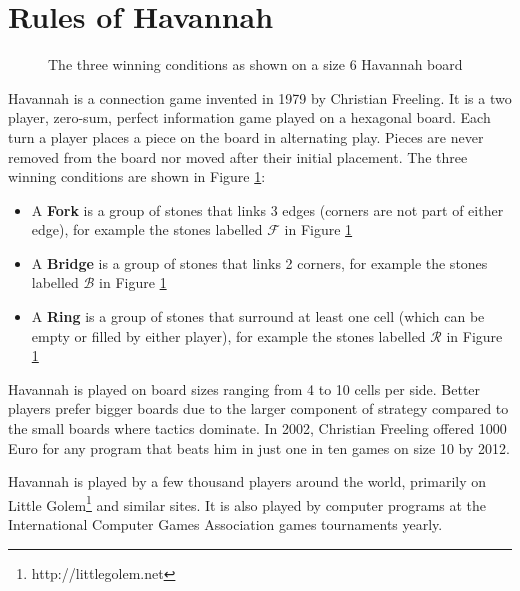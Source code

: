


\section{Rules of Havannah}


\begin{figure}[tb]
\centering
\begin{HavannahBoard}[board size=6,coordinate style=classical]
\end{HavannahBoard}
\caption{The three winning conditions as shown on a size 6 Havannah board}
\label{fig:rules}
\end{figure}

Havannah is a connection game invented in 1979 by Christian Freeling. It is a two player, zero-sum, perfect information game played on a hexagonal board. Each turn a player places a piece on the board in alternating play. Pieces are never removed from the board nor moved after their initial placement. The three winning conditions are shown in Figure \ref{fig:rules}:
\begin{itemize}
	\setlength{\itemsep}{0pt}
	\setlength{\parskip}{0pt}
	\setlength{\parsep}{0pt}
	\item A \textbf{Fork} is a group of stones that links 3 edges (corners are not part of either edge), for example the stones labelled $\mathcal F$ in Figure \ref{fig:rules}
	\item A \textbf{Bridge} is a group of stones that links 2 corners, for example the stones labelled $\mathcal B$ in Figure \ref{fig:rules}
	\item A \textbf{Ring} is a group of stones that surround at least one cell (which can be empty or filled by either player), for example the stones labelled $\mathcal R$ in Figure \ref{fig:rules}
\end{itemize}

Havannah is played on board sizes ranging from 4 to 10 cells per side. Better players prefer bigger boards due to the larger component of strategy compared to the small boards where tactics dominate. In 2002, Christian Freeling offered 1000 Euro for any program that beats him in just one in ten games on size 10 by 2012.

Havannah is played by a few thousand players around the world, primarily on Little Golem\footnote{http://littlegolem.net} and similar sites. It is also played by computer programs at the International Computer Games Association games tournaments yearly.


